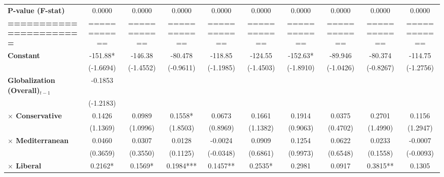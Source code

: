 \begin{center}
\begin{tabular}{lccccccccc}
\textbf{P-value (F-stat)}          &     0.0000     &      0.0000      &      0.0000      &      0.0000      &      0.0000      &      0.0000      &      0.0000      &      0.0000      &      0.0000       \\
\textbf{=======================}   &  ============  &   ============   &   ============   &   ============   &   ============   &   ============   &   ============   &   ============   &   ============    \\
\textbf{Constant}                     &    -151.88*    &     -146.38      &     -80.478      &     -118.85      &     -124.55      &     -152.63*     &     -89.946      &     -80.374      &     -114.75       \\
\textbf{ }                         &   (-1.6694)    &    (-1.4552)     &    (-0.9611)     &    (-1.1985)     &    (-1.4503)     &    (-1.8910)     &    (-1.0426)     &    (-0.8267)     &    (-1.2756)      \\
\textbf{Globalization (Overall)$_{t-1}$}               &    -0.1853     &                  &                  &                  &                  &                  &                  &                  &                   \\
\textbf{ }                         &   (-1.2183)    &                  &                  &                  &                  &                  &                  &                  &                   \\
\textbf{$\times$ Conservative}         &     0.1426     &      0.0989      &     0.1558*      &      0.0673      &      0.1661      &      0.1914      &      0.0375      &      0.2701      &      0.1156       \\
\textbf{ }                         &    (1.1369)    &     (1.0996)     &     (1.8503)     &     (0.8969)     &     (1.1382)     &     (0.9063)     &     (0.4702)     &     (1.4990)     &     (1.2947)      \\
\textbf{$\times$ Mediterranean}        &     0.0460     &      0.0307      &      0.0128      &     -0.0024      &      0.0909      &      0.1254      &      0.0622      &      0.0233      &     -0.0007       \\
\textbf{ }                         &    (0.3659)    &     (0.3550)     &     (0.1125)     &    (-0.0348)     &     (0.6861)     &     (0.9973)     &     (0.6548)     &     (0.1558)     &    (-0.0093)      \\
\textbf{$\times$ Liberal}              &    0.2162*     &     0.1569*      &    0.1984***     &     0.1457**     &     0.2535*      &      0.2981      &      0.0917      &     0.3815**     &      0.1305       \\

\end{tabular}
\end{center}
